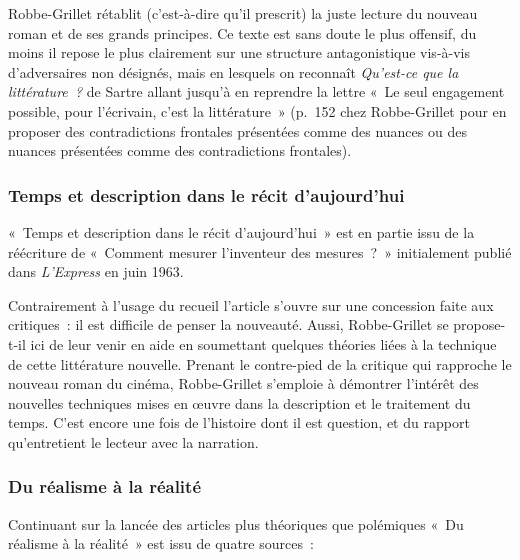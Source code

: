 \documentclass[12pt, a4paper]{article}
\begin{document}
Robbe-Grillet rétablit (c'est-à-dire qu'il prescrit) la juste lecture du nouveau roman et de ses grands principes. Ce texte est sans doute le plus offensif, du moins il repose le plus clairement sur une structure antagonistique vis-à-vis d'adversaires non désignés, mais en lesquels on reconnaît \textit{Qu'est-ce que la littérature~?} de Sartre allant jusqu'à en reprendre la lettre «~Le seul engagement possible, pour l'écrivain, c'est la littérature~» (p.~152 chez Robbe-Grillet pour en proposer des contradictions frontales présentées comme des nuances ou des nuances présentées comme des contradictions frontales).


\subsubsection{Temps et description dans le récit d'aujourd'hui}
«~Temps et description dans le récit d'aujourd'hui~» est en partie issu de la réécriture de «~Comment mesurer l'inventeur des mesures~?~» initialement publié dans \textit{L'Express} en juin 1963.

Contrairement à l'usage du recueil l'article s'ouvre sur une concession faite aux critiques~: il est difficile de penser la nouveauté. Aussi, Robbe-Grillet se propose-t-il ici de leur venir en aide en soumettant quelques théories liées à la technique de cette littérature nouvelle. Prenant le contre-pied de la critique qui rapproche le nouveau roman du cinéma, Robbe-Grillet s'emploie à démontrer l'intérêt des nouvelles techniques mises en œuvre dans la description et le traitement du temps. C'est encore une fois de l'histoire dont il est question, et du rapport qu'entretient le lecteur avec la narration.


\subsubsection{Du réalisme à la réalité}
			Continuant sur la lancée des articles plus théoriques que polémiques «~Du réalisme à la réalité~» est issu de quatre sources~:
\end{document}
